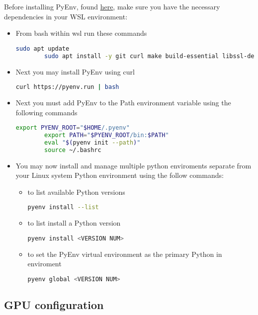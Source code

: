 Before installing PyEnv, found \href{https://github.com/pyenv/pyenv}{here}, make sure you have the necessary dependencies in your WSL environment:
\begin{itemize}
	\item From bash within wsl run these commands
	\begin{lstlisting}[language=bash]
		sudo apt update
		sudo apt install -y git curl make build-essential libssl-dev zlib1g-dev libbz2-dev libreadline-dev libsqlite3-dev wget llvm libncurses5-dev xz-utils tk-dev libxml2-dev libxmlsec1-dev libffi-dev liblzma-dev \end{lstlisting}

	\item Next you may install PyEnv using curl
	\begin{lstlisting}[language=bash]
		curl https://pyenv.run | bash \end{lstlisting}
	
	\item Next you must add PyEnv to the Path environment variable using the following commands
	\begin{lstlisting}[language=bash]
		export PYENV_ROOT="$HOME/.pyenv"
		export PATH="$PYENV_ROOT/bin:$PATH"
		eval "$(pyenv init --path)"
		source ~/.bashrc \end{lstlisting}
	\item You may now install and manage multiple python enviroments separate from your Linux system Python environment using the follow commands:
	\begin{itemize}
		\item to list available Python versions
		\begin{lstlisting}[language=bash]
			pyenv install --list \end{lstlisting}
		\item to list install a Python version
		\begin{lstlisting}[language=bash]
			pyenv install <VERSION NUM> \end{lstlisting}
		\item to set the PyEnv virtual environment as the primary Python in enviroment 
		\begin{lstlisting}[language=bash]
			pyenv global <VERSION NUM> \end{lstlisting}
	\end{itemize}

\end{itemize}

\subsection{GPU configuration}


